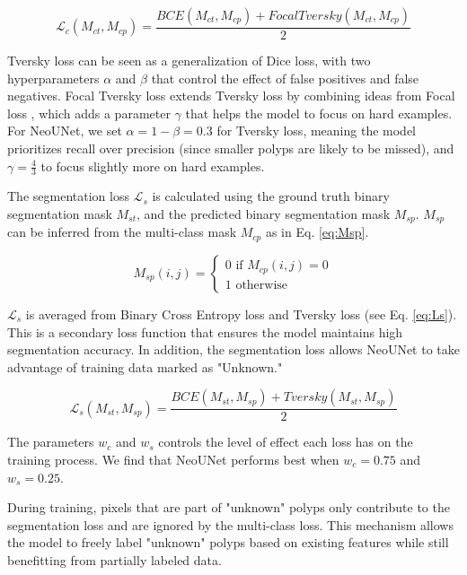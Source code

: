 \documentclass[runningheads]{llncs}
\newcommand{\ModelName}{NeoUNet\xspace}
\begin{document}
	\begin{equation}
	\label{eq:Lc}
	\mathcal{L}_{c}(M_{ct}, M_{cp}) = \frac{BCE(M_{ct}, M_{cp}) + FocalTversky(M_{ct}, M_{cp})}{2}
	\end{equation}

	Tversky loss \cite{salehi2017tversky} can be seen as a generalization of Dice loss, with two hyperparameters $\alpha$ and $\beta$ that control the effect of false positives and false negatives. Focal Tversky loss \cite{abraham2019novel} extends Tversky loss by combining ideas from Focal loss \cite{lin2017focal}, which adds a parameter $\gamma$ that helps the model to focus on hard examples. For \ModelName, we set $\alpha = 1 - \beta = 0.3$ for Tversky loss, meaning the model prioritizes recall over precision (since smaller polyps are likely to be missed), and $\gamma = \frac{4}{3}$ to focus slightly more on hard examples.

	The segmentation loss $\mathcal{L}_{s}$ is calculated using the ground truth binary segmentation mask $M_{st}$, and the predicted binary segmentation mask $M_{sp}$. $M_{sp}$ can be inferred from the multi-class mask $M_{cp}$ as in Eq. \eqref{eq:Msp}.

	\begin{equation}
	\label{eq:Msp}
	M_{sp}(i, j) = \begin{cases}
	0 \text{ if } M_{cp}(i, j) = 0 \\
	1 \text{ otherwise }
	\end{cases}
	\end{equation}

	$\mathcal{L}_{s}$ is averaged from Binary Cross Entropy loss and Tversky loss (see Eq. \eqref{eq:Ls}). This is a secondary loss function that ensures the model maintains high segmentation accuracy. In addition, the segmentation loss allows \ModelName to take advantage of training data marked as "Unknown."

	\begin{equation}
	\label{eq:Ls}
	\mathcal{L}_{s}(M_{st}, M_{sp}) = \frac{BCE(M_{st}, M_{sp}) + Tversky(M_{st}, M_{sp})}{2}
	\end{equation}

	The parameters $w_c$ and $w_s$ controls the level of effect each loss has on the training process. We find that \ModelName performs best when $w_c = 0.75$ and $w_s = 0.25$.

	During training, pixels that are part of "unknown" polyps only contribute to the segmentation loss and are ignored by the multi-class loss. This mechanism allows the model to freely label "unknown" polyps based on existing features while still benefitting from partially labeled data.
\end{document}
